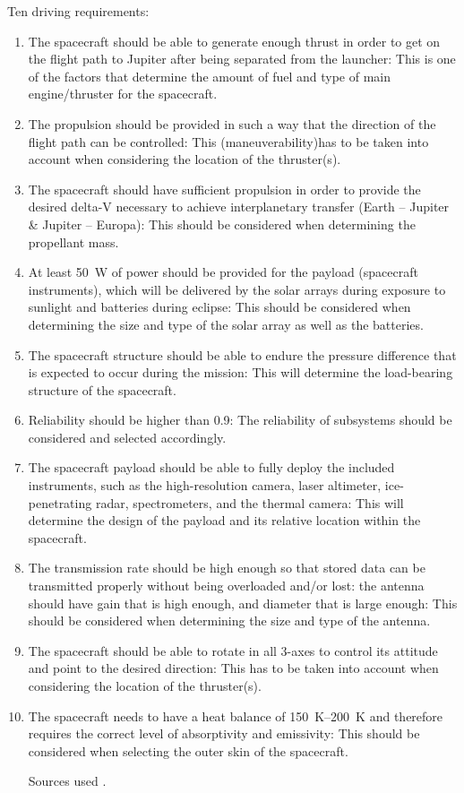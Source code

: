 Ten driving requirements:
\begin{enumerate}
\item{The spacecraft should be able to generate enough thrust in order
  to get on the flight path to Jupiter after being separated from the
  launcher:} This is one of the factors that determine the amount of
  fuel and type of main engine/thruster for the spacecraft.
\item{The propulsion should be provided in such a way that the
  direction of the flight path can be controlled:} This
  (maneuverability)has to be taken into account when considering the
  location of the thruster(s).
\item{The spacecraft should have sufficient propulsion in order to
  provide the desired delta-V necessary to achieve interplanetary
  transfer (Earth -- Jupiter \& Jupiter -- Europa):} This should be
  considered when determining the propellant mass.
\item{At least \SI{50}{W} of power should be provided for the payload
  (spacecraft instruments), which will be delivered by the solar
  arrays during exposure to sunlight and batteries during eclipse:}
  This should be considered when determining the size and type of the
  solar array as well as the batteries.
\item{The spacecraft structure should be able to endure the pressure
  difference that is expected to occur during the mission:} This will
  determine the load-bearing structure of the spacecraft.
\item{Reliability should be higher than 0.9:} The reliability of
  subsystems should be considered and selected accordingly.
\item{The spacecraft payload should be able to fully deploy the
  included instruments, such as the high-resolution camera, laser
  altimeter, ice-penetrating radar, spectrometers, and the thermal
  camera:} This will determine the design of the payload and its
  relative location within the spacecraft.
\item{The transmission rate should be high enough so that stored data
  can be transmitted properly without being overloaded and/or lost:
  the antenna should have gain that is high enough, and diameter that
  is large enough:} This should be considered when determining the
  size and type of the antenna.
\item{The spacecraft should be able to rotate in all 3-axes to control
  its attitude and point to the desired direction:} This has to be
  taken into account when considering the location of the thruster(s).
\item{The spacecraft needs to have a heat balance of
  \SI{150}{K}--\SI{200}{K} and therefore requires the correct level of
  absorptivity and emissivity:} This should be considered when
  selecting the outer skin of the spacecraft.

  Sources used \cite{projectreader,fortescue2011spacecraft}.

\end{enumerate}

